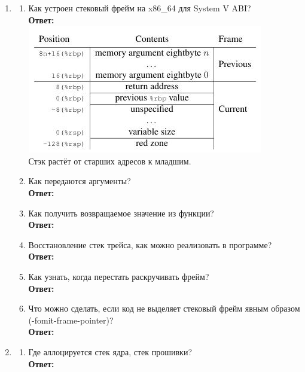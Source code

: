 \documentclass[a4paper,12pt]{article}
\begin{document}
	\begin{enumerate}
		\item \begin{enumerate}
			\item Как устроен стековый фрейм на x86\_64 для System V ABI?\\
			\textbf{Ответ:}\\
			\includegraphics{stack_frame.jpg}\\
			Стэк растёт от старших адресов к младшим.
			
			\item Как передаются аргументы?\\
			\textbf{Ответ:}\\
			
			
			\item Как получить возвращаемое значение из функции?\\
			\textbf{Ответ:}\\
			
			
			\item Восстановление стек трейса, как можно реализовать в программе?\\
			\textbf{Ответ:}\\
			
			
			\item Как узнать, когда перестать раскручивать фрейм?\\
			\textbf{Ответ:}\\
			
			
			\item Что можно сделать, если код не выделяет стековый фрейм явным образом\\ (-fomit-frame-pointer)?\\
			\textbf{Ответ:}\\
			
			
		\end{enumerate}
	\item \begin{enumerate}
		\item Где аллоцируется стек ядра, стек прошивки?\\
		\textbf{Ответ:}\\
		

\end{enumerate}
\end{enumerate}
\end{document}
